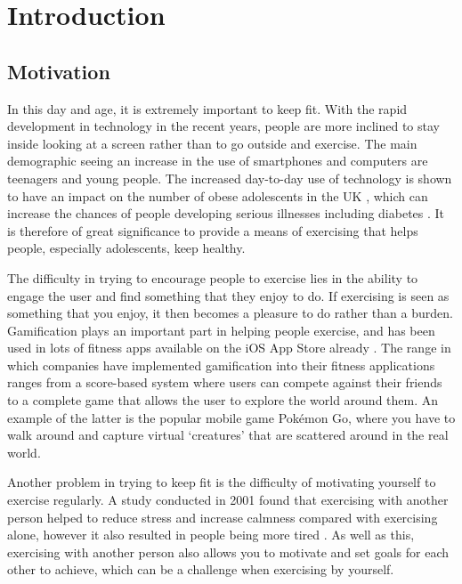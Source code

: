 \chapter{Introduction}

\section{Motivation}


In this day and age, it is extremely important to keep fit. With the rapid development in technology in the recent years, people are more inclined to stay inside looking at a screen rather than to go outside and exercise. The main demographic seeing an increase in the use of smartphones and computers are teenagers and young people. The increased day-to-day use of technology is shown to have an impact on the number of obese adolescents in the UK \cite{Kautiainen2005}, which can increase the chances of people developing serious illnesses including diabetes \cite{Lazar2005}. It is therefore of great significance to provide a means of exercising that helps people, especially adolescents, keep healthy.

The difficulty in trying to encourage people to exercise lies in the ability to engage the user and find something that they enjoy to do. If exercising is seen as something that you enjoy, it then becomes a pleasure to do rather than a burden. Gamification plays an important part in helping people exercise, and has been used in lots of fitness apps available on the iOS App Store already \cite{Lister2014}. The range in which companies have implemented gamification into their fitness applications ranges from a score-based system where users can compete against their friends to a complete game that allows the user to explore the world around them. An example of the latter is the popular mobile game Pok\'{e}mon Go, where you have to walk around and capture virtual `creatures' that are scattered around in the real world.

Another problem in trying to keep fit is the difficulty of motivating yourself to exercise regularly. A study conducted in 2001 found that exercising with another person helped to reduce stress and increase calmness compared with exercising alone, however it also resulted in people being more tired \cite{Plante2001a}. As well as this, exercising with another person also allows you to motivate and set goals for each other to achieve, which can be a challenge when exercising by yourself.

